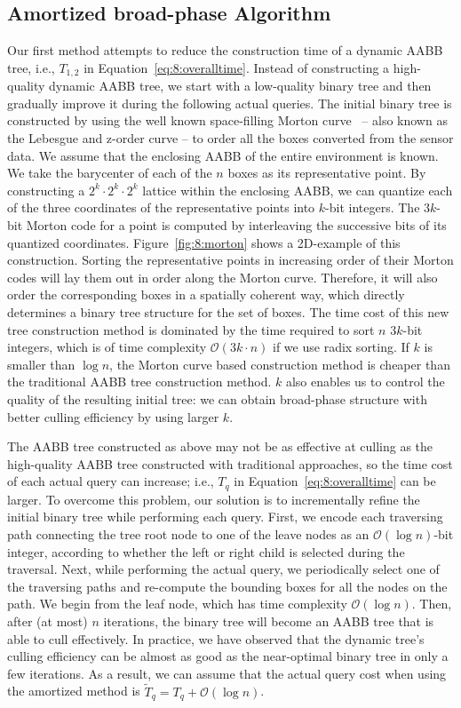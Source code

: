 \subsection{Amortized broad-phase Algorithm}
Our first method attempts to reduce the construction time of a dynamic
AABB tree, i.e., $T_{1,2}$ in Equation~\ref{eq:8:overalltime}. Instead
of constructing a high-quality dynamic AABB tree, we start with a low-quality binary tree and then gradually improve it during the following
actual queries. The initial binary tree is constructed by using the
well known space-filling Morton curve~\cite{Morton:1966} -- also known as the Lebesgue
and z-order curve -- to order all the boxes converted from the sensor data. We assume that the
enclosing AABB of the entire environment is known. We take the
barycenter of each of the $n$ boxes as its representative point. By
constructing a $2^k \cdot 2^k \cdot 2^k$ lattice within the enclosing
AABB, we can quantize each of the three coordinates of the
representative points into $k$-bit integers. The $3k$-bit Morton code
for a point is computed by interleaving the successive bits of its
quantized coordinates. Figure~\ref{fig:8:morton} shows a 2D-example of
this construction. Sorting the representative points in increasing
order of their Morton codes will lay them out in order along the
Morton curve. Therefore, it will also order the corresponding boxes
in a spatially coherent way, which directly determines a binary tree
structure for the set of boxes. The time cost of this new tree
construction method is dominated by the time required to sort $n$ $3k$-bit
integers, which is of time complexity $\mathcal O(3k \cdot n)$ if we
use radix sorting. If $k$ is smaller than $\log n$, the Morton curve
based construction method is cheaper than the traditional AABB tree
construction method. $k$ also enables us to control the
quality of the resulting initial tree: we can obtain broad-phase
structure with better culling efficiency by using larger $k$.

The AABB tree constructed as above may not be as effective at culling
as the high-quality AABB tree constructed with traditional approaches, so the time cost of each actual query can increase; i.e., $T_q$ in Equation~\ref{eq:8:overalltime}
can be larger. To overcome this problem, our solution is to
incrementally refine the initial binary tree while performing each
query. First, we encode each traversing path
connecting the tree root node to one of the leave nodes as an $\mathcal
O(\log n)$-bit integer, according to whether the left or right child
is selected during the traversal. Next, while performing the actual query, we
periodically select one of the traversing paths and re-compute the
bounding boxes for all the nodes on the path. We begin from the leaf
node, which has time complexity $\mathcal O(\log n)$. Then, after (at most) $n$ iterations, the binary tree will become an AABB tree that is able to cull effectively. In practice, we have observed that the dynamic
tree's culling efficiency can be almost as good as the near-optimal
binary tree in only a few iterations. As a result, we can assume that the
actual query cost when using the amortized method is $\widetilde{T}_q
= T_q + \mathcal O(\log n)$.

